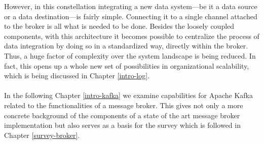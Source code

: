 However, in this constellation integrating a new data system---be it a data source or a data destination---is fairly 
simple. Connecting it to a single channel attached to the broker is all what is needed 
to be done. Besides the loosely coupled components, with this architecture
it becomes possible to centralize the process of data integration by doing so
in a standardized way, directly within the broker. Thus, a huge factor of complexity 
over the system landscape is being reduced. In fact, this opens up a whole new
set of possibilities in organizational scalability, which is being discussed in
Chapter \ref{intro-log}. 
\\ \\
In the following Chapter \ref{intro-kafka} we examine capabilities for Apache Kafka
related to the functionalities of a message broker. This gives not only a more concrete 
background of the components of a state of the art message broker implementation but also 
serves as a basis for the survey which is followed in Chapter
\ref{survey-broker}.



